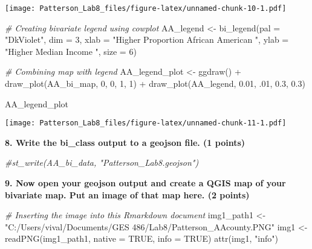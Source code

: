 \documentclass[
]{article}
\newenvironment{Shaded}{\begin{snugshade}}{\end{snugshade}}
\newcommand{\AttributeTok}[1]{\textcolor[rgb]{0.77,0.63,0.00}{#1}}
\newcommand{\CommentTok}[1]{\textcolor[rgb]{0.56,0.35,0.01}{\textit{#1}}}
\newcommand{\ConstantTok}[1]{\textcolor[rgb]{0.00,0.00,0.00}{#1}}
\newcommand{\DecValTok}[1]{\textcolor[rgb]{0.00,0.00,0.81}{#1}}
\newcommand{\FloatTok}[1]{\textcolor[rgb]{0.00,0.00,0.81}{#1}}
\newcommand{\FunctionTok}[1]{\textcolor[rgb]{0.00,0.00,0.00}{#1}}
\newcommand{\NormalTok}[1]{#1}
\newcommand{\OtherTok}[1]{\textcolor[rgb]{0.56,0.35,0.01}{#1}}
\newcommand{\SpecialCharTok}[1]{\textcolor[rgb]{0.00,0.00,0.00}{#1}}
\newcommand{\StringTok}[1]{\textcolor[rgb]{0.31,0.60,0.02}{#1}}
\begin{document}
\texttt{[image: Patterson\_Lab8\_files/figure-latex/unnamed-chunk-10-1.pdf]}

\begin{Shaded}
\begin{Highlighting}[]
\CommentTok{\# Creating bivariate legend using cowplot}
\NormalTok{AA\_legend }\OtherTok{\textless{}{-}} \FunctionTok{bi\_legend}\NormalTok{(}\AttributeTok{pal =} \StringTok{"DkViolet"}\NormalTok{,}
                    \AttributeTok{dim =} \DecValTok{3}\NormalTok{,}
                    \AttributeTok{xlab =} \StringTok{"Higher Proportion African American "}\NormalTok{,}
                    \AttributeTok{ylab =} \StringTok{"Higher Median Income "}\NormalTok{,}
                    \AttributeTok{size =} \DecValTok{6}\NormalTok{)}

\CommentTok{\# Combining map with legend}
\NormalTok{AA\_legend\_plot }\OtherTok{\textless{}{-}} \FunctionTok{ggdraw}\NormalTok{() }\SpecialCharTok{+}
  \FunctionTok{draw\_plot}\NormalTok{(AA\_bi\_map, }\DecValTok{0}\NormalTok{, }\DecValTok{0}\NormalTok{, }\DecValTok{1}\NormalTok{, }\DecValTok{1}\NormalTok{) }\SpecialCharTok{+}
  \FunctionTok{draw\_plot}\NormalTok{(AA\_legend, }\FloatTok{0.01}\NormalTok{, .}\DecValTok{01}\NormalTok{, }\FloatTok{0.3}\NormalTok{, }\FloatTok{0.3}\NormalTok{)}

\NormalTok{AA\_legend\_plot}
\end{Highlighting}
\end{Shaded}

\texttt{[image: Patterson\_Lab8\_files/figure-latex/unnamed-chunk-11-1.pdf]}

\textbf{8. Write the bi\_class output to a geojson file. (1 points)}

\begin{Shaded}
\begin{Highlighting}[]
\CommentTok{\#st\_write(AA\_bi\_data, "Patterson\_Lab8.geojson")}
\end{Highlighting}
\end{Shaded}

\textbf{9. Now open your geojson output and create a QGIS map of your
bivariate map. Put an image of that map here. (2 points)}

\begin{Shaded}
\begin{Highlighting}[]
\CommentTok{\# Inserting the image into this Rmarkdown document}
\NormalTok{img1\_path1 }\OtherTok{\textless{}{-}} \StringTok{"C:/Users/vival/Documents/GES 486/Lab8/Patterson\_AAcounty.PNG"}
\NormalTok{img1 }\OtherTok{\textless{}{-}} \FunctionTok{readPNG}\NormalTok{(img1\_path1, }\AttributeTok{native =} \ConstantTok{TRUE}\NormalTok{, }\AttributeTok{info =} \ConstantTok{TRUE}\NormalTok{)}
\FunctionTok{attr}\NormalTok{(img1, }\StringTok{"info"}\NormalTok{)}
\end{Highlighting}
\end{Shaded}
\end{document}
